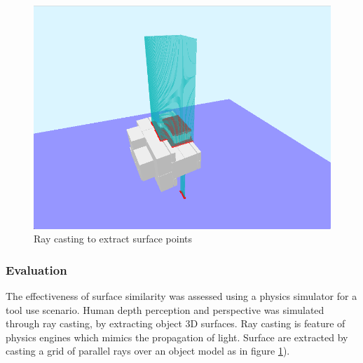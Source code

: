 \documentclass[
    floatsintext
]{article}
\begin{document}
\begin{figure}[!h]
  \centering
  \includegraphics[width=.7\textwidth]{./figures/raycasting.png}
  \caption{Ray casting to extract surface points}
  \label{fig:raycasting}
\end{figure}  

\subsubsection{Evaluation}
The effectiveness of surface similarity was assessed using a physics simulator for a tool use scenario. 
Human depth perception and perspective was simulated through ray casting, by extracting object 3D surfaces. 
Ray casting is feature of physics engines which mimics the propagation of light. 
Surface are extracted by casting a grid of parallel rays over an object model as in figure \ref{fig:raycasting}). 
\end{document}
